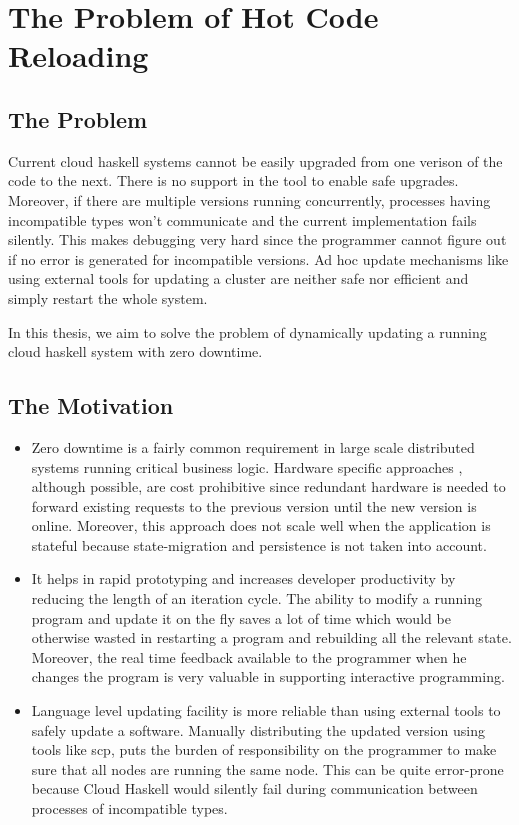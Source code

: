 \section{The Problem of Hot Code Reloading}

\subsection{The Problem}

Current cloud haskell systems cannot be easily upgraded from one
verison of the code to the next. There is no support in the tool to
enable safe upgrades. Moreover, if there are multiple versions running
concurrently, processes having incompatible types won't communicate
and the current implementation fails silently. This makes debugging
very hard since the programmer cannot figure out if no error is
generated for incompatible versions. Ad hoc update mechanisms like
using external tools for updating a cluster are neither safe nor
efficient and simply restart the whole system.

In this thesis, we aim to solve the problem of dynamically updating a
running cloud haskell system with zero downtime.

\subsection{The Motivation}

\begin{itemize}
\item Zero downtime is a fairly common requirement in large scale
  distributed systems running critical business logic. Hardware
  specific approaches , although possible, are cost prohibitive since
  redundant hardware is needed to forward existing requests to the
  previous version until the new version is online. Moreover, this
  approach does not scale well  when the application is stateful because
  state-migration and persistence is not taken into account.
\item It helps in rapid prototyping and increases developer
  productivity by reducing the length of an iteration cycle. The
  ability to modify a running program and update it on the fly saves a
  lot of time which would be otherwise wasted in restarting a program
  and rebuilding all the relevant state. Moreover, the real time
  feedback available to the programmer when he changes the program is
  very valuable in supporting interactive programming.
\item Language level updating facility is more reliable than using
  external tools to safely update a software. Manually distributing
  the updated version using tools like scp, puts the burden of
  responsibility on the programmer to make sure that all nodes are
  running the same node. This can be quite error-prone because Cloud
  Haskell would silently fail during communication between processes
  of incompatible types.
\end{itemize}

